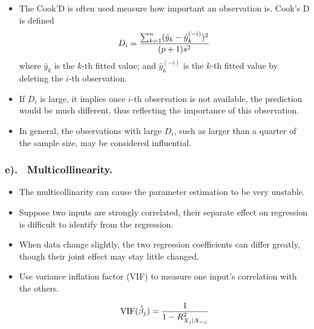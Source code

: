 \documentclass{beamer}
\begin{document}
      \begin{frame} 
      	\frametitle{   }
      	\begin{itemize}
      		
      		\item     The Cook'D is often used measure how important an observation is.
      		Cook's D is defined
      		$$ D_i = { \sum_{k=1}^n ({\hat y}_k - {\hat y}_k^{(-i)})^2 \over (p+1) s^2 }$$
      		where ${\hat y}_k$ is the $k$-th fitted value; and ${\hat y}_k^{(-i)}$ is the $k$-th fitted
      		value by deleting the $i$-th observation. 
      		\item   If $D_i$ is large, it implies once $i$-th observation
      		is not available, the prediction would be much different, thus reflecting the importance of
      		this observation.
      		\item   
      		In general, the observations with large $D_i$, such as larger than a quarter of the sample size, may be
      		considered influential.
      		
      	\end{itemize}
      \end{frame}
      
      
      
      \begin{frame}
      	\frametitle{e). \ Multicollinearity. }
      	\begin{itemize}
      		
      		\item  The multicollinarity can cause the parameter estimation
      		to be very unstable. 
      		
      		\item   Suppose two inputs are strongly correlated, their separate effect on
      		regression is difficult to identify from the regression. 
      		
      		\item   When data change slightly, the
      		two regression coefficients can differ greatly, though their joint effect may stay little
      		changed. 
      		\item   Use variance inflation factor (VIF) to measure one input's correlation
      		with the others. 
      		
      		$$\hbox{VIF}(\hat \beta_j ) = {1 \over 1- R^2_{X_j | X_{-j}}}$$
      		
      			\end{itemize}
      		\end{frame}
      		
\end{document}
